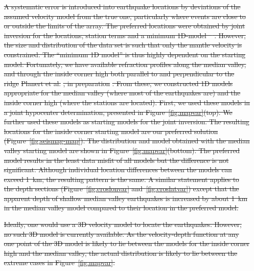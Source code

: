 \documentclass[jgrga]{agu2001} %
\newlength{\tw}
\providecommand{\DIFdel}[1]{{\protect\color{red}\sout{#1}}}                      %
\begin{document}
\begin{article}
\DIFdel{A systematic error is introduced into earthquake locations by
deviations of the assumed velocity model from the true one, particularly where
events are close to or outside the limits of the array.  The preferred
locations were obtained by joint inversion for the locations,
station terms and a minimum 1D-model \mbox{%
\citep[using
VELEST,][]{kissling94}}%
. However, the size and distribution of the data
set is such that only the mantle velocity is constrained.
The ``minimum 1D model'' is thus highly dependent on the starting
model.  Fortunately, we have available refraction profiles along the median
valley, and through the inside corner high both parallel to and
perpendicular to the ridge }%
\DIFdel{Planert et al.}%
\DIFdel{,
in preparation}%
\DIFdel{.  From these, we constructed 1D models appropriate for
the median valley (where most of the earthquakes are) and the inside
corner high (where the stations are located).  First, we used these
models in a joint hypocenter determination, presented in Figure~\ref{fig:mapvar}(top).
We further used these
models as starting models for the joint inversion. The resulting
locations for the inside corner starting model are our preferred
solution (Figure~\ref{fig:seismag-map}). The distribution and model obtained with the median valley
starting model are shown in Figure~\ref{fig:mapvar}(bottom).  The
preferred model results in the least data misfit of all models but the
difference is not significant.  Although individual location
differences between the models can exceed 1~km, the resulting pattern
is the same.  A similar statement applies to the depth sections
(Figure~\ref{fig:croslonvar} and~\ref{fig:croslatvar}) except that the
apparent depth of shallow median valley earthquakes is 
increased by about 1~km in the median valley model compared to their
location in the preferred model.
}%

\DIFdel{Ideally, one would use a 3D velocity model to locate the earthquakes.
However, no such 3D model is currently available.
As the velocity-depth function at
any one point of the 3D model is likely to lie between the models for
the inside corner high and the median valley, the actual distribution
is likely to lie between the extreme cases in Figure~\ref{fig:mapvar}.
}%


\end{article}
\end{document}
